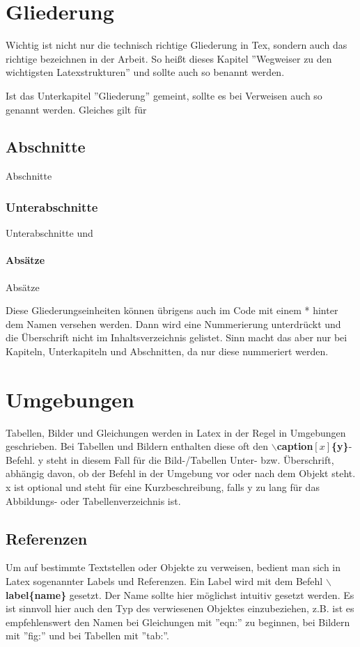 		\section {Gliederung}
			Wichtig ist nicht nur die technisch richtige Gliederung in Tex,
			sondern auch das richtige bezeichnen in der Arbeit. So heißt
			dieses Kapitel ''Wegweiser zu den wichtigsten Latexstrukturen''
			und sollte auch so benannt werden.
			
			Ist das Unterkapitel ''Gliederung'' gemeint, sollte es bei
			Verweisen auch so genannt werden. Gleiches gilt für
			\subsection {Abschnitte}
			Abschnitte
			\subsubsection {Unterabschnitte}
			Unterabschnitte und
			\paragraph {Absätze}
			Absätze
			
			Diese Gliederungseinheiten können übrigens auch im Code mit einem
			* hinter dem Namen versehen werden. Dann wird eine Nummerierung
			unterdrückt und die Überschrift nicht im Inhaltsverzeichnis
			gelistet. Sinn macht das aber nur bei Kapiteln, Unterkapiteln und
			Abschnitten, da nur diese nummeriert werden.

		\section {Umgebungen}
			Tabellen, Bilder und Gleichungen werden in Latex in der Regel in
			Umgebungen geschrieben. Bei Tabellen und Bildern enthalten diese
			oft den \textbf{$\backslash$caption$[x]$\{y\}}-Befehl. y steht in
			diesem Fall für die Bild-/Tabellen Unter- bzw. Überschrift,
			abhängig davon, ob der Befehl in der Umgebung vor oder nach dem
			Objekt
			steht.\\
			x ist optional und steht für eine Kurzbeschreibung, falls y zu
			lang für das Abbildungs- oder Tabellenverzeichnis ist.
			
			\subsection {Referenzen}
			Um auf bestimmte Textstellen oder Objekte zu verweisen, bedient
			man sich in Latex sogenannter Labels und Referenzen. Ein Label
			wird mit dem Befehl \textbf{$\backslash$label\{name\}} gesetzt.
			Der Name sollte hier möglichst intuitiv gesetzt werden. Es ist
			sinnvoll hier auch den Typ des verwiesenen Objektes einzubeziehen,
			z.B. ist es empfehlenswert den Namen bei Gleichungen mit ''eqn:''
			zu beginnen, bei Bildern mit ''fig:'' und bei Tabellen mit
			''tab:''.
			
